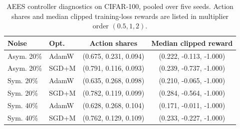 \begin{table}[H]
\centering
\caption{AEES controller diagnostics on CIFAR-100, pooled over five seeds.
Action shares and median clipped training-loss rewards are listed in
multiplier order $(0.5,1,2)$.}
\label{tab:appendix-cifar-controller}
\scriptsize
\setlength{\tabcolsep}{3.2pt}
\renewcommand{\arraystretch}{1.05}
\begin{tabular}{llcc}
\toprule
Noise & Opt. & Action shares & Median clipped reward \\
\midrule
Asym. 20\% & AdamW & (0.675, 0.231, 0.094) & (0.222, -0.113, -1.000) \\
Asym. 20\% & SGD+M & (0.791, 0.116, 0.093) & (0.239, -0.737, -1.000) \\
Sym. 20\% & AdamW & (0.635, 0.268, 0.098) & (0.210, -0.065, -1.000) \\
Sym. 20\% & SGD+M & (0.782, 0.119, 0.099) & (0.284, -0.564, -1.000) \\
Sym. 40\% & AdamW & (0.628, 0.268, 0.104) & (0.171, -0.011, -1.000) \\
Sym. 40\% & SGD+M & (0.762, 0.129, 0.109) & (0.233, -0.227, -1.000) \\
\bottomrule
\end{tabular}
\end{table}
